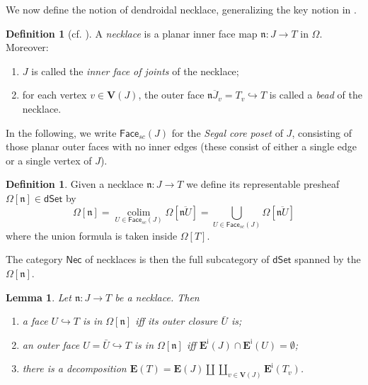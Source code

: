 \documentclass[a4paper,10pt
,draft
]{article}%
\numberwithin{equation}{section}
\numberwithin{figure}{section}
\newtheorem{lemma}[equation]{Lemma}%
\theoremstyle{definition} %
\newtheorem{definition}[equation]{Definition}%
\DeclareMathOperator{\colim}{colim}%
\newcommand{\1}{\ensuremath{\mathbbm 1}}%
\begin{document}
We now define the notion of dendroidal necklace,
generalizing the key notion in \cite{DS11}.
 

\begin{definition}[{cf. \cite[\S 3]{DS11}}]
	A \emph{necklace} is 
	a planar inner face map
	$\mathfrak{n} \colon J \to T$
	in $\Omega$.
	Moreover:
	\begin{enumerate}[label = (\roman*)]
		\item 
		$J$ is called the \emph{inner face of joints} of the necklace;
		\item for each vertex $v \in \boldsymbol{V}(J)$,
		the outer face
		$\overline{\mathfrak{n} J_v} = T_v \hookrightarrow T$
		is called a \emph{bead} of the necklace.
	\end{enumerate}
\end{definition}

In the following, we write 
$\mathsf{Face}_{sc}(J)$ for the \emph{Segal core poset} of $J$,
consisting of those planar outer faces with no inner edges
(these consist of either a single edge or a single vertex of $J$).



\begin{definition}
	Given a necklace $\mathfrak{n} \colon J \to T$ 
	we define its representable presheaf
	$\Omega[\mathfrak{n}] \in \mathsf{dSet}$ by
	\begin{equation}
	\Omega[\mathfrak{n}] 
	= 
	\underset{U \in \mathsf{Face}_{sc}(J)}{\colim}
	\Omega[\overline{\mathfrak{n} U}]
	=
	\bigcup_{U \in \mathsf{Face}_{sc}(J)} 
	\Omega[\overline{\mathfrak{n} U}]
	\end{equation}
	where the union formula is taken inside $\Omega[T]$.
	
	The category $\mathsf{Nec}$ of necklaces is then the full subcategory of $\mathsf{dSet}$
	spanned by the $\Omega[\mathfrak{n}]$.
\end{definition}



\begin{lemma}\label{FACEINNECK LEM}
	Let $\mathfrak{n} \colon J \to T$ be a necklace. Then
	\begin{enumerate}[label=(\roman*)]
		\item a face $U \hookrightarrow T$
		is in $\Omega[\mathfrak{n}]$
		iff its outer closure $\bar{U}$ is; 
		\item an outer face 
		$U = \bar{U} \hookrightarrow T$
		is in $\Omega[\mathfrak{n}]$ iff 
		$\boldsymbol{E}^{\mathsf{i}}(J) \cap 
		\boldsymbol{E}^{\mathsf{i}}(U) = \emptyset$;
		\item there is a decomposition
		$
		\boldsymbol{E}(T) = 
		\boldsymbol{E}(J) \amalg 
		\coprod_{v \in \boldsymbol{V}(J)}
		\boldsymbol{E}^{\mathsf{i}}(T_v)
		$.
	\end{enumerate}
\end{lemma}
\end{document}
